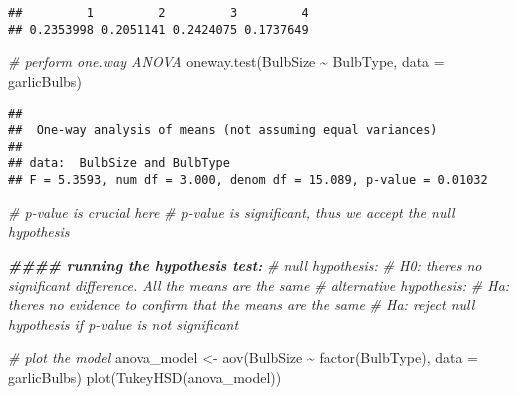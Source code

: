\documentclass[
]{article}
\newenvironment{Shaded}{\begin{snugshade}}{\end{snugshade}}
\newcommand{\AttributeTok}[1]{\textcolor[rgb]{0.77,0.63,0.00}{#1}}
\newcommand{\CommentTok}[1]{\textcolor[rgb]{0.56,0.35,0.01}{\textit{#1}}}
\newcommand{\DocumentationTok}[1]{\textcolor[rgb]{0.56,0.35,0.01}{\textbf{\textit{#1}}}}
\newcommand{\FunctionTok}[1]{\textcolor[rgb]{0.00,0.00,0.00}{#1}}
\newcommand{\NormalTok}[1]{#1}
\newcommand{\OtherTok}[1]{\textcolor[rgb]{0.56,0.35,0.01}{#1}}
\newcommand{\SpecialCharTok}[1]{\textcolor[rgb]{0.00,0.00,0.00}{#1}}
\begin{document}
\begin{Shaded}
\end{Shaded}

\begin{verbatim}
##         1         2         3         4 
## 0.2353998 0.2051141 0.2424075 0.1737649
\end{verbatim}

\begin{Shaded}
\begin{Highlighting}[]
\CommentTok{\# perform one.way ANOVA }
\FunctionTok{oneway.test}\NormalTok{(BulbSize }\SpecialCharTok{\textasciitilde{}}\NormalTok{ BulbType,}
            \AttributeTok{data =}\NormalTok{ garlicBulbs)}
\end{Highlighting}
\end{Shaded}

\begin{verbatim}
## 
##  One-way analysis of means (not assuming equal variances)
## 
## data:  BulbSize and BulbType
## F = 5.3593, num df = 3.000, denom df = 15.089, p-value = 0.01032
\end{verbatim}

\begin{Shaded}
\begin{Highlighting}[]
\CommentTok{\# p{-}value is crucial here}
\CommentTok{\# p{-}value is significant, thus we accept the null hypothesis}

\DocumentationTok{\#\#\#\# running the hypothesis test:}
\CommentTok{\#\textquotesingle{} null hypothesis:}
\CommentTok{\#\textquotesingle{} H0: there\textquotesingle{}s no significant difference. All the means are the same}
\CommentTok{\#\textquotesingle{} alternative hypothesis:}
\CommentTok{\#\textquotesingle{} Ha: there\textquotesingle{}s no evidence to confirm that the means are the same}
\CommentTok{\#\textquotesingle{} Ha: reject null hypothesis if p{-}value is not significant}

\CommentTok{\# plot the model}
\NormalTok{anova\_model }\OtherTok{\textless{}{-}} \FunctionTok{aov}\NormalTok{(BulbSize }\SpecialCharTok{\textasciitilde{}} \FunctionTok{factor}\NormalTok{(BulbType),}
                   \AttributeTok{data =}\NormalTok{ garlicBulbs)}
\FunctionTok{plot}\NormalTok{(}\FunctionTok{TukeyHSD}\NormalTok{(anova\_model))}
\end{Highlighting}
\end{Shaded}
\end{document}
